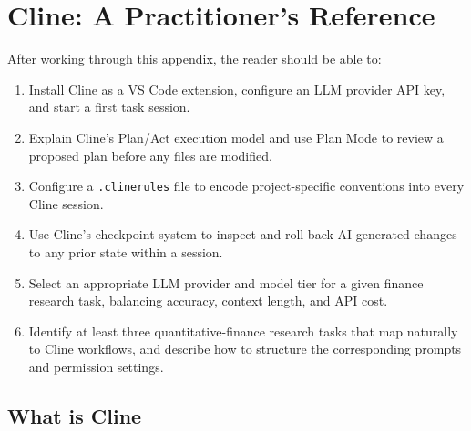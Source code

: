 \chapter{Cline: A Practitioner's Reference}
\label{app:cline}

\begin{remark}
After working through this appendix, the reader should be able to:
\begin{enumerate}
  \item Install Cline as a VS Code extension, configure an LLM provider API key,
        and start a first task session.
  \item Explain Cline's Plan/Act execution model and use Plan Mode to review
        a proposed plan before any files are modified.
  \item Configure a \texttt{.clinerules} file to encode project-specific
        conventions into every Cline session.
  \item Use Cline's checkpoint system to inspect and roll back AI-generated
        changes to any prior state within a session.
  \item Select an appropriate LLM provider and model tier for a given finance
        research task, balancing accuracy, context length, and API cost.
  \item Identify at least three quantitative-finance research tasks that map
        naturally to Cline workflows, and describe how to structure the
        corresponding prompts and permission settings.
\end{enumerate}
\end{remark}

\section{What is Cline}
\label{app:cline:overview}

